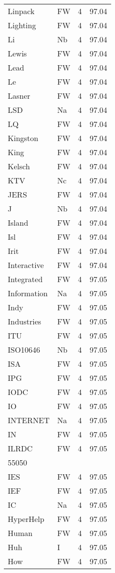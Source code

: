 \documentclass[twocolumn]{book}
\begin{document}
\begin{supertabular}{llrr}
Linpack & FW & 4 &  97.04\\
Lighting & FW & 4 &  97.04\\
Li & Nb & 4 &  97.04\\
Lewis & FW & 4 &  97.04\\
Lead & FW & 4 &  97.04\\
Le & FW & 4 &  97.04\\
Lasner & FW & 4 &  97.04\\
LSD & Na & 4 &  97.04\\
LQ & FW & 4 &  97.04\\
Kingston & FW & 4 &  97.04\\
King & FW & 4 &  97.04\\
Kelsch & FW & 4 &  97.04\\
KTV & Nc & 4 &  97.04\\
JERS & FW & 4 &  97.04\\
J & Nb & 4 &  97.04\\
Island & FW & 4 &  97.04\\
Isl & FW & 4 &  97.04\\
Irit & FW & 4 &  97.04\\
Interactive & FW & 4 &  97.04\\
Integrated & FW & 4 &  97.05\\
Information & Na & 4 &  97.05\\
Indy & FW & 4 &  97.05\\
Industries & FW & 4 &  97.05\\
ITU & FW & 4 &  97.05\\
ISO10646 & Nb & 4 &  97.05\\
ISA & FW & 4 &  97.05\\
IPG & FW & 4 &  97.05\\
IODC & FW & 4 &  97.05\\
IO & FW & 4 &  97.05\\
INTERNET & Na & 4 &  97.05\\
IN & FW & 4 &  97.05\\
ILRDC & FW & 4 &  97.05\\
55050\\
IES & FW & 4 &  97.05\\
IEF & FW & 4 &  97.05\\
IC & Na & 4 &  97.05\\
HyperHelp & FW & 4 &  97.05\\
Human & FW & 4 &  97.05\\
Huh & I & 4 &  97.05\\
How & FW & 4 &  97.05\\

\end{supertabular}
\end{document}
